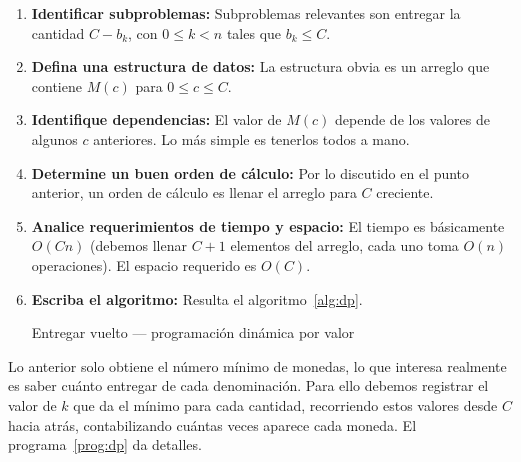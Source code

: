\documentclass[english, spanish, fleqn]{article}
\begin{document}
\begin{enumerate}[label = {(\alph*)}]
\begin{algorithm}
      \caption{Entregar vuelto --- recursivo por valor}
      \label{alg:recursive}
    \end{algorithm}
  \item \textbf{Identificar subproblemas:}
    Subproblemas relevantes son entregar la cantidad \(C - b_k\),
    con \(0 \le k < n\) tales que \(b_k \le C\).
  \item \textbf{Defina una estructura de datos:}
    La estructura obvia es un arreglo que contiene \(M(c)\) para
    \(0 \le c \le C\).
  \item \textbf{Identifique dependencias:}
    El valor de \(M(c)\) depende de los valores de algunos \(c\) anteriores.
    Lo más simple es tenerlos todos a mano.
  \item \textbf{Determine un buen orden de cálculo:}
    Por lo discutido en el punto anterior,
    un orden de cálculo es llenar el arreglo para \(C\) creciente.
  \item \textbf{Analice requerimientos de tiempo y espacio:}
    El tiempo es básicamente \(O(C n)\)
    (debemos llenar \(C + 1\) elementos del arreglo,
     cada uno toma \(O(n)\) operaciones).
    El espacio requerido es \(O(C)\).
  \item \textbf{Escriba el algoritmo:}
    Resulta el algoritmo~\ref{alg:dp}.
    \begin{algorithm}
      \DontPrintSemicolon\Indp


      \caption{Entregar vuelto --- programación dinámica por valor}
      \label{alg:dp}
    \end{algorithm}
  \end{enumerate}
  Lo anterior solo obtiene el número mínimo de monedas,
  lo que interesa realmente es saber cuánto entregar de cada denominación.
  Para ello debemos
  registrar el valor de \(k\) que da el mínimo para cada cantidad,
  recorriendo estos valores desde \(C\) hacia atrás,
  contabilizando cuántas veces aparece cada moneda.
  El programa~\ref{prog:dp} da detalles.
  
\end{document}
